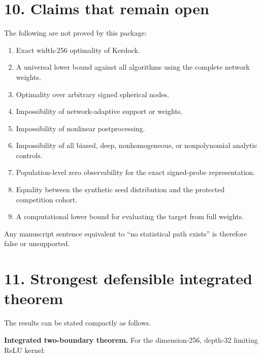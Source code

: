 \documentclass[
  10pt,
]{article}
\providecommand{\tightlist}{%
  \setlength{\itemsep}{0pt}\setlength{\parskip}{0pt}}
\begin{document}
\section{10. Claims that remain open}\label{claims-that-remain-open}

The following are not proved by this package:

\begin{enumerate}
\def\labelenumi{\arabic{enumi}.}
\tightlist
\item
  Exact width-256 optimality of Kerdock.
\item
  A universal lower bound against all algorithms using the complete
  network weights.
\item
  Optimality over arbitrary signed spherical nodes.
\item
  Impossibility of network-adaptive support or weights.
\item
  Impossibility of nonlinear postprocessing.
\item
  Impossibility of all biased, deep, nonhomogeneous, or nonpolynomial
  analytic controls.
\item
  Population-level zero observability for the exact signed-probe
  representation.
\item
  Equality between the synthetic seed distribution and the protected
  competition cohort.
\item
  A computational lower bound for evaluating the target from full
  weights.
\end{enumerate}

Any manuscript sentence equivalent to ``no statistical path exists'' is
therefore false or unsupported.

\section{11. Strongest defensible integrated
theorem}\label{strongest-defensible-integrated-theorem}

The results can be stated compactly as follows.

\textbf{Integrated two-boundary theorem.} For the dimension-256,
depth-32 limiting ReLU kernel:
\end{document}
